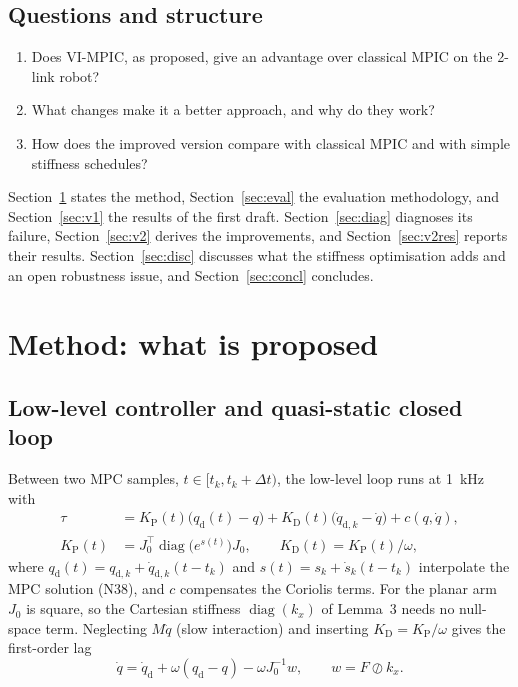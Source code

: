 \documentclass[11pt,a4paper]{article}
\newcommand{\qd}{q_{\mathrm{d}}}
\newcommand{\dqd}{\dot{q}_{\mathrm{d}}}
\newcommand{\T}{^{\top}}
\newcommand{\kx}{k_{x}}
\begin{document}
\subsection{Questions and structure}
\begin{enumerate}[label=Q\arabic*.]
\item Does VI-MPIC, as proposed, give an advantage over classical MPIC on the 2-link robot?
\item What changes make it a better approach, and why do they work?
\item How does the improved version compare with classical MPIC and with simple stiffness schedules?
\end{enumerate}
Section~\ref{sec:method} states the method, Section~\ref{sec:eval} the evaluation methodology, and
Section~\ref{sec:v1} the results of the first draft. Section~\ref{sec:diag} diagnoses its failure,
Section~\ref{sec:v2} derives the improvements, and Section~\ref{sec:v2res} reports their results.
Section~\ref{sec:disc} discusses what the stiffness optimisation adds and an open robustness issue, and
Section~\ref{sec:concl} concludes.

\section{Method: what is proposed}\label{sec:method}

\subsection{Low-level controller and quasi-static closed loop}
Between two MPC samples, $t\in[t_k,t_k+\Delta t)$, the low-level loop runs at \SI{1}{kHz} with
\begin{equation}\label{eq:torque}
\begin{aligned}
\tau &= K_\mathrm{P}(t)\bigl(\qd(t)-q\bigr)+K_\mathrm{D}(t)\bigl(\dot q_{\mathrm{d},k}-\dot q\bigr)+c(q,\dot q),\\
K_\mathrm{P}(t)&=J_0\T\operatorname{diag}\bigl(e^{s(t)}\bigr)J_0,\qquad K_\mathrm{D}(t)=K_\mathrm{P}(t)/\omega ,
\end{aligned}
\end{equation}
where $\qd(t)=q_{\mathrm{d},k}+\dot q_{\mathrm{d},k}(t-t_k)$ and $s(t)=s_k+\dot s_k(t-t_k)$ interpolate the MPC solution (N38),
and $c$ compensates the Coriolis terms. For the planar arm $J_0$ is square, so the Cartesian stiffness
$\operatorname{diag}(\kx)$ of Lemma~3 needs no null-space term. Neglecting $M\ddot q$ (slow interaction)
and inserting $K_\mathrm{D}=K_\mathrm{P}/\omega$ gives the first-order lag
\begin{equation}\label{eq:qdot}
\dot q=\dqd+\omega(\qd-q)-\omega J_0^{-1}w,\qquad w=F\oslash \kx .
\end{equation}
\end{document}
